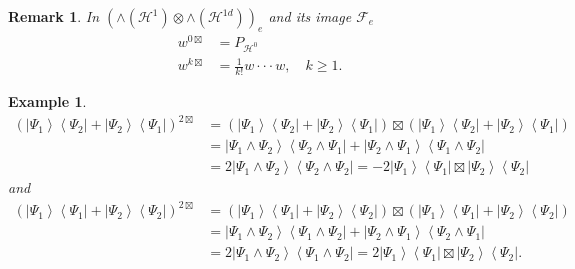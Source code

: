 \documentclass[aps,preprint]{revtex4}%
\newtheorem{example}[theorem]{Example}
\newtheorem{remark}[theorem]{Remark}
\begin{document}
\begin{remark}
\bigskip In $\left(  \wedge\left(  \mathcal{H}^{1}\right)  \otimes
\wedge\left(  \mathcal{H}^{1d}\right)  \right)  _{e}$ and its image
$\mathcal{F}_{e}$
\begin{align}
w^{0\boxtimes}  &  =P_{\mathcal{H}^{0}}\\
w^{k\boxtimes}  &  =\frac{1}{k!}w\cdot\cdot\cdot w,\quad k\geq1.
\end{align}

\end{remark}

\begin{example}%
\begin{align}
\left(  \left\vert \Psi_{1}\right\rangle \left\langle \Psi_{2}\right\vert
+\left\vert \Psi_{2}\right\rangle \left\langle \Psi_{1}\right\vert \right)
^{2\boxtimes}  &  =\left(  \left\vert \Psi_{1}\right\rangle \left\langle
\Psi_{2}\right\vert +\left\vert \Psi_{2}\right\rangle \left\langle \Psi
_{1}\right\vert \right)  \boxtimes\left(  \left\vert \Psi_{1}\right\rangle
\left\langle \Psi_{2}\right\vert +\left\vert \Psi_{2}\right\rangle
\left\langle \Psi_{1}\right\vert \right) \\
&  =\left\vert \Psi_{1}\wedge\Psi_{2}\right\rangle \left\langle \Psi_{2}%
\wedge\Psi_{1}\right\vert +\left\vert \Psi_{2}\wedge\Psi_{1}\right\rangle
\left\langle \Psi_{1}\wedge\Psi_{2}\right\vert \\
&  =2\left\vert \Psi_{1}\wedge\Psi_{2}\right\rangle \left\langle \Psi
_{2}\wedge\Psi_{2}\right\vert =-2\left\vert \Psi_{1}\right\rangle \left\langle
\Psi_{1}\right\vert \boxtimes\left\vert \Psi_{2}\right\rangle \left\langle
\Psi_{2}\right\vert
\end{align}
and
\begin{align}
\left(  \left\vert \Psi_{1}\right\rangle \left\langle \Psi_{1}\right\vert
+\left\vert \Psi_{2}\right\rangle \left\langle \Psi_{2}\right\vert \right)
^{2\boxtimes}  &  =\left(  \left\vert \Psi_{1}\right\rangle \left\langle
\Psi_{1}\right\vert +\left\vert \Psi_{2}\right\rangle \left\langle \Psi
_{2}\right\vert \right)  \boxtimes\left(  \left\vert \Psi_{1}\right\rangle
\left\langle \Psi_{1}\right\vert +\left\vert \Psi_{2}\right\rangle
\left\langle \Psi_{2}\right\vert \right) \\
&  =\left\vert \Psi_{1}\wedge\Psi_{2}\right\rangle \left\langle \Psi_{1}%
\wedge\Psi_{2}\right\vert +\left\vert \Psi_{2}\wedge\Psi_{1}\right\rangle
\left\langle \Psi_{2}\wedge\Psi_{1}\right\vert \\
&  =2\left\vert \Psi_{1}\wedge\Psi_{2}\right\rangle \left\langle \Psi
_{1}\wedge\Psi_{2}\right\vert =2\left\vert \Psi_{1}\right\rangle \left\langle
\Psi_{1}\right\vert \boxtimes\left\vert \Psi_{2}\right\rangle \left\langle
\Psi_{2}\right\vert .
\end{align}

\end{example}
\end{document}
